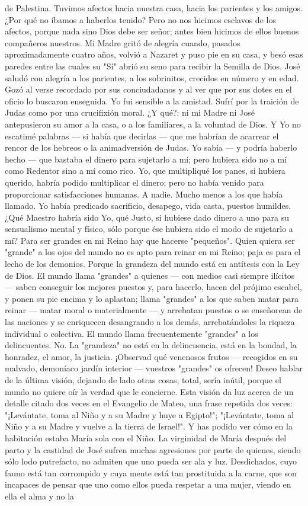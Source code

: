 \documentclass[12pt, twoside, openright]{book} %
\begin{document}
de Palestina. Tuvimos afectos hacia nuestra casa, hacia los parientes y los amigos. ¿Por qué no íbamos a haberlos tenido? Pero no nos hicimos esclavos de los afectos, porque nada sino Dios debe ser señor; antes bien hicimos de ellos buenos compañeros nuestros. Mi Madre gritó de alegría cuando, pasados aproximadamente cuatro años, volvió a Nazaret y puso pie en su casa, y besó esas paredes entre las cuales su "Sí" abrió su seno para recibir la Semilla de Dios. José saludó con alegría a los parientes, a los sobrinitos, crecidos en número y en edad. Gozó al verse recordado por sus conciudadanos y al ver que por sus dotes en el oficio lo buscaron enseguida. Yo fui sensible a la amistad. Sufrí por la traición de Judas como por una crucifixión moral. ¿Y qué?: ni mi Madre ni José antepusieron su amor a la casa, o a los familiares, a la voluntad de Dios. Y Yo no escatimé palabras — si había que decirlas — que me habrían de acarrear el rencor de los hebreos o la animadversión de Judas. Yo sabía — y podría haberlo hecho — que bastaba el dinero para sujetarlo a mí; pero hubiera sido no a mí como Redentor sino a mí como rico. Yo, que multipliqué los panes, si hubiera querido, habría podido multiplicar el dinero; pero no había venido para proporcionar satisfacciones humanas. A nadie. Mucho menos a los que había llamado. Yo había predicado sacrificio, desapego, vida casta, puestos humildes. ¿Qué Maestro habría sido Yo, qué Justo, si hubiese dado dinero a uno para su sensualismo mental y físico, sólo porque ése hubiera sido el modo de sujetarlo a mí? Para ser grandes en mi Reino hay que hacerse "pequeños". Quien quiera ser "grande" a los ojos del mundo no es apto para reinar en mi Reino; paja es para el lecho de los demonios. Porque la grandeza del mundo está en antítesis con la Ley de Dios. El mundo llama "grandes" a quienes — con medios casi siempre ilícitos — saben conseguir los mejores puestos y, para hacerlo, hacen del prójimo escabel, y ponen su pie encima y lo aplastan; llama "grandes" a los que saben matar para reinar — matar moral o materialmente — y arrebatan puestos o se enseñorean de las naciones y se enriquecen desangrando a los demás, arrebatándoles la riqueza individual o colectiva. El mundo llama frecuentemente "grandes" a los delincuentes. No. La "grandeza" no está en la delincuencia, está en la bondad, la honradez, el amor, la justicia. ¡Observad qué venenosos frutos — recogidos en su malvado, demoníaco jardín interior — vuestros "grandes" os ofrecen! Deseo hablar de la última visión, dejando de lado otras cosas, total, sería inútil, porque el mundo no quiere oír la verdad que le concierne. Esta visión da luz acerca de un detalle citado dos veces en el Evangelio de Mateo, una frase repetida dos veces: "¡Levántate, toma al Niño y a su Madre y huye a Egipto!"; "¡Levántate, toma al Niño y a su Madre y vuelve a la tierra de Israel!". Y has podido ver cómo en la habitación estaba María sola con el Niño. La virginidad de María después del parto y la castidad de José sufren muchas agresiones por parte de quienes, siendo sólo lodo putrefacto, no admiten que uno pueda ser ala y luz. Desdichados, cuyo fauno está tan corrompido y cuya mente está tan prostituida a la carne, que son incapaces de pensar que uno como ellos pueda respetar a una mujer, viendo en ella el alma y no la 
\end{document}
